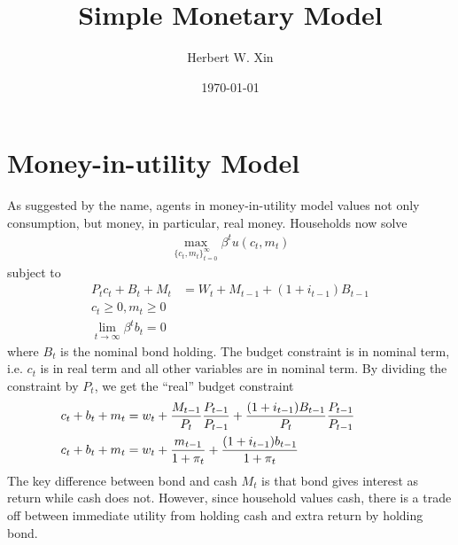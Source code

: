 \documentclass[twocolumn, fleqn]{article}
\begin{document}
	\title{Simple Monetary Model}
	\author{Herbert W. Xin}
	\date{\today}
	\maketitle

	\tableofcontents
	\thispagestyle{fancy}
	
	\section{Money-in-utility Model}
	As suggested by the name, agents in money-in-utility model values not only consumption, but money, in particular, real money. Households now solve 
	\begin{align*}
		\max_{\{c_t, m_t\}_{t=0}^{\infty}} \beta^t u(c_t, m_t)
	\end{align*}
	subject to 
	\begin{align*}
		P_t c_t + B_t + M_t &= W_t + M_{t-1} + (1+ i_{t-1})B_{t-1}\\
		c_t \geq 0, m_t \geq 0\\
		\lim_{t\rightarrow \infty} \beta^t b_t =0
	\end{align*}
	where $B_t$ is the nominal bond holding. The budget constraint is in nominal term, i.e. $c_t$ is in real term and all other variables are in nominal term. By dividing the constraint by $P_t$, we get the ``real'' budget constraint
	\begin{align*}
		\hspace{-36pt} c_t + b_t + m_t &= w_t + \frac{M_{t-1}}{P_t}\frac{P_{t-1}}{P_{t-1}} + \frac{(1+ i_{t-1})B_{t-1}}{P_t}\frac{P_{t-1}}{P_{t-1}}\\
		\hspace{-36pt} c_t + b_t + m_t &= w_t + \frac{m_{t-1}}{1+\pi_t} + \frac{(1+ i_{t-1})b_{t-1}}{1+\pi_t}
	\end{align*}
	The key difference between bond and cash $M_t$ is that bond gives interest as return while cash does not. However, since household values cash, there is a trade off between immediate utility from holding cash and extra return by holding bond. 
	
\end{document}

